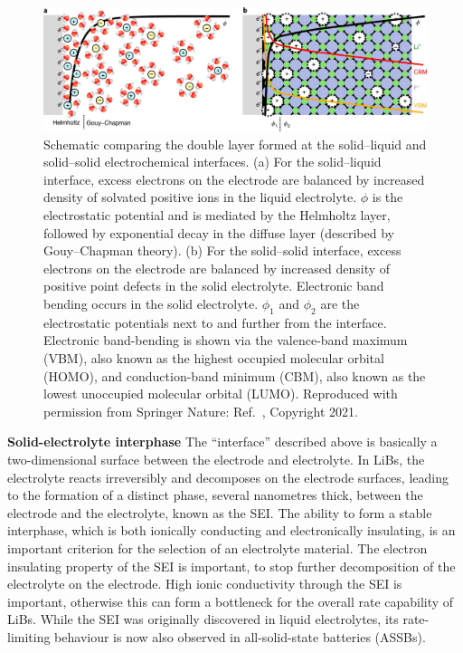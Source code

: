 \documentclass[../main.tex]{subfiles}
\begin{document}
\begin{figure}
    \centering
    \includegraphics[scale=0.35]{figures/edl.jpg}
    \caption{Schematic comparing the double layer formed at the solid–liquid and solid–solid electrochemical interfaces. (a) For the solid–liquid interface, excess electrons on the electrode are balanced by increased density of solvated positive ions in the liquid electrolyte. $\phi$ is the electrostatic potential and is mediated by the Helmholtz layer, followed by exponential decay in the diffuse layer (described by Gouy–Chapman theory). (b) For the solid–solid interface, excess electrons on the electrode are balanced by increased density of positive point defects in the solid electrolyte. Electronic band bending occurs in the solid electrolyte. $\phi_1$ and $\phi_2$ are the electrostatic potentials next to and further from the interface. Electronic band-bending is shown via the valence-band maximum (VBM), also known as the highest occupied molecular orbital (HOMO), and conduction-band minimum (CBM), also known as the lowest unoccupied molecular orbital (LUMO). Reproduced with permission from Springer Nature: Ref.~, Copyright 2021.}
    \label{fig:edl}
\end{figure}

\textbf{Solid-electrolyte interphase} The ``interface'' described above is basically a two-dimensional surface between the electrode and electrolyte. In LiBs, the electrolyte reacts irreversibly and decomposes on the electrode surfaces, leading to the formation of a distinct phase, several nanometres thick, between the electrode and the electrolyte, known as the SEI.\cite{Xu2011} The ability to form a stable interphase, which is both ionically conducting and electronically insulating, is an important criterion for the selection of an electrolyte material. The electron insulating property of the SEI is important, to stop further decomposition of the electrolyte on the electrode.\cite{Xu2004,Goodenough2010} High ionic conductivity through the SEI is important, otherwise this can form a bottleneck for the overall rate capability of LiBs.\cite{Wang2018, Xu2014} While the SEI was originally discovered in liquid electrolytes, its rate-limiting behaviour is now also observed in all-solid-state batteries (ASSBs).\cite{Yu2017}
\end{document}
